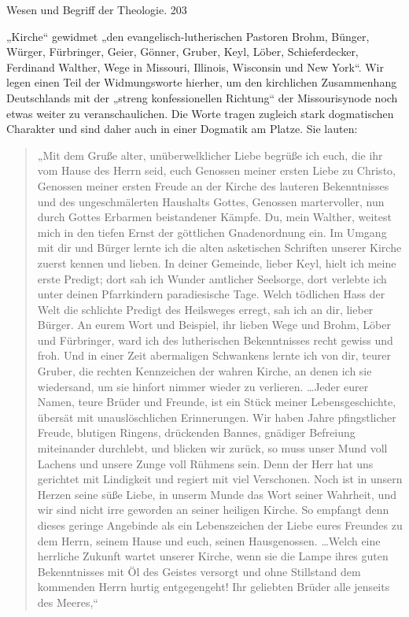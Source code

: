 Wesen und Begriff der Theologie. \hfill 203\par\noindent „Kirche“ gewidmet „den evangelisch-lutherischen Pastoren Brohm, Bünger, Würger, Fürbringer, Geier, Gönner, Gruber, Keyl, Löber, Schieferdecker, Ferdinand Walther, Wege in Missouri, Illinois, Wisconsin und New York“. Wir legen einen Teil der Widmungsworte hierher, um den kirchlichen Zusammenhang Deutschlands mit der „streng konfessionellen Richtung“ der Missourisynode noch etwas weiter zu veranschaulichen. Die Worte tragen zugleich stark dogmatischen Charakter und sind daher auch in einer Dogmatik am Platze. Sie lauten:\par\begin{quote}„Mit dem Gruße alter, unüberwelklicher Liebe begrüße ich euch, die ihr vom Hause des Herrn seid, euch Genossen meiner ersten Liebe zu Christo, Genossen meiner ersten Freude an der Kirche des lauteren Bekenntnisses und des ungeschmälerten Haushalts Gottes, Genossen martervoller, nun durch Gottes Erbarmen beistandener Kämpfe. Du, mein Walther, weitest mich in den tiefen Ernst der göttlichen Gnadenordnung ein. Im Umgang mit dir und Bürger lernte ich die alten asketischen Schriften unserer Kirche zuerst kennen und lieben. In deiner Gemeinde, lieber Keyl, hielt ich meine erste Predigt; dort sah ich Wunder amtlicher Seelsorge, dort verlebte ich unter deinen Pfarrkindern paradiesische Tage. Welch tödlichen Hass der Welt die schlichte Predigt des Heilsweges erregt, sah ich an dir, lieber Bürger. An eurem Wort und Beispiel, ihr lieben Wege und Brohm, Löber und Fürbringer, ward ich des lutherischen Bekenntnisses recht gewiss und froh. Und in einer Zeit abermaligen Schwankens lernte ich von dir, teurer Gruber, die rechten Kennzeichen der wahren Kirche, an denen ich sie wiedersand, um sie hinfort nimmer wieder zu verlieren. \ldots Jeder eurer Namen, teure Brüder und Freunde, ist ein Stück meiner Lebensgeschichte, übersät mit unauslöschlichen Erinnerungen. Wir haben Jahre pfingstlicher Freude, blutigen Ringens, drückenden Bannes, gnädiger Befreiung miteinander durchlebt, und blicken wir zurück, so muss unser Mund voll Lachens und unsere Zunge voll Rühmens sein. Denn der Herr hat uns gerichtet mit Lindigkeit und regiert mit viel Verschonen. Noch ist in unsern Herzen seine süße Liebe, in unserm Munde das Wort seiner Wahrheit, und wir sind nicht irre geworden an seiner heiligen Kirche. So empfangt denn dieses geringe Angebinde als ein Lebenszeichen der Liebe eures Freundes zu dem Herrn, seinem Hause und euch, seinen Hausgenossen. \ldots Welch eine herrliche Zukunft wartet unserer Kirche, wenn sie die Lampe ihres guten Bekenntnisses mit Öl des Geistes versorgt und ohne Stillstand dem kommenden Herrn hurtig entgegengeht! Ihr geliebten Brüder alle jenseits des Meeres,“\end{quote}